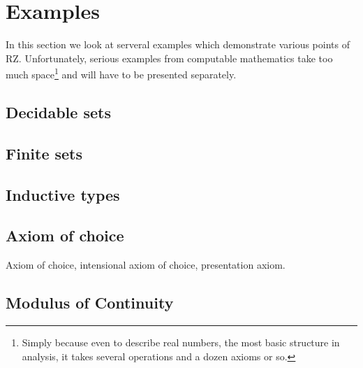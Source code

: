 \section{Examples}
\label{sec:examples}

In this section we look at serveral examples which demonstrate various
points of RZ. Unfortunately, serious examples from computable
mathematics take too much space\footnote{Simply because even to
  describe real numbers, the most basic structure in analysis, it
  takes several operations and a dozen axioms or so.} and will have to
be presented separately.

\subsection{Decidable sets}
\label{sec:decidable-sets}



\subsection{Finite sets}
\label{sec:finite-sets}


\subsection{Inductive types}
\label{sec:inductive-types}



\subsection{Axiom of choice}
\label{sec:axiom-choice}

Axiom of choice, intensional axiom of choice, presentation axiom.


\subsection{Modulus of Continuity}
\label{sec:we-show-modulus-of-continuity-example}

